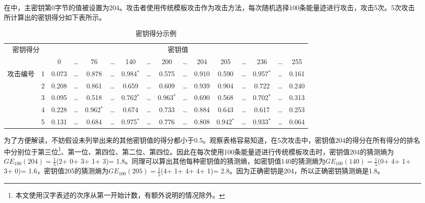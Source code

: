 {	\begin{example}\label{ex:badge}
		在中，主密钥第0字节的值被设置为204。攻击者使用传统模板攻击作为攻击方法，每次随机选择100条能量迹进行攻击，攻击5次。5次攻击所计算出的密钥得分如下表所示。
		
		\begin{table*}[!h]
			\caption{密钥得分示例}
			\scriptsize{
				\begin{tabular}{cc|cccccccccccccc}
					\hline
					\multicolumn{2}{c|}{\multirow{2}{*}{密钥得分}} & \multicolumn{14}{c}{密钥值} \\
					\multicolumn{2}{c|}{}
					    &     0 & \dots &    76 & \dots &   140 & \dots &   200 & \dots &   204 &   205 & \dots &   236 & \dots &   255\\
					\hline
					\multirow{5}{*}{攻击编号} 
					& 1 & 0.073 & \dots & 0.878 & \dots & 0.984$^*$ & \dots & 0.575 & \dots & 0.910 & 0.590 & \dots & 0.957$^*$ & \dots & 0.161\\
					
					& 2 & 0.208 & \dots & 0.861 & \dots & 0.659 & \dots & 0.609 & \dots & 0.939 & 0.904 & \dots & 0.722 & \dots & 0.240\\
					
					& 3 & 0.095 & \dots & 0.518 & \dots & 0.762$^*$ & \dots & 0.963$^*$ & \dots & 0.690 & 0.568 & \dots & 0.702$^*$ & \dots & 0.313\\
					
					& 4 & 0.228 & \dots & 0.962$^*$ & \dots & 0.674 & \dots & 0.733 & \dots & 0.884 & 0.643 & \dots & 0.617 & \dots & 0.253\\
					
					& 5 & 0.131 & \dots & 0.684 & \dots & 0.975$^*$ & \dots & 0.776 & \dots & 0.808 & 0.942$^*$ & \dots & 0.933$^*$ & \dots & 0.064\\
					
					\hline
				\end{tabular}
			}
		\end{table*}
	
		为了方便解读，不妨假设未列举出来的其他密钥值的得分都小于0.5。观察表格容易知道，在5次攻击中，密钥值204的得分在所有得分的排名中分别位于第三位\footnote{本文使用汉字表述的次序从第一开始计数，有额外说明的情况除外。}、第一位、第四位、第二位、第四位。因此在每次使用100条能量迹进行传统模板攻击时，密钥值204的猜测熵为$GE_{100}(204)=\frac15$(2+ 0+ 3+ 1+ 3)= 1.8。同理可以算出其他每种密钥值的猜测熵，如密钥值140的猜测熵为$GE_{100}(140)=\frac15$(0+ 4+ 1+ 3+ 0)= 1.6，密钥值205的猜测熵为$GE_{100}(205)=\frac15$(4+ 1+ 4+ 4+ 1)= 2.8。因为正确密钥是204，所以正确密钥猜测熵是1.8。
	\end{example}
}
